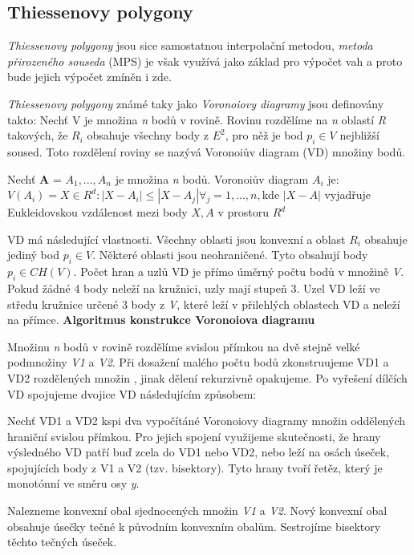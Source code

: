 \documentclass[12pt,a4paper]{article}
\begin{document}
\subsection{Thiessenovy polygony}
\textit{Thiessenovy polygony} jsou sice samostatnou interpolační metodou, \textit{metoda přirozeného souseda} (MPS) je však využívá jako základ pro výpočet vah a proto bude jejich výpočet zmíněn i zde.

\textit{Thiessenovy polygony} známé taky jako \textit{Voronoiovy diagramy} jsou definovány takto: Nechť V je množina \textit{n} bodů v rovině. Rovinu rozdělíme na \textit{n} oblastí \textit{R} takových, že $R_i$ obsahuje všechny body z $E^2$, pro něž je bod $p_i  \in V$ nejbližší soused. Toto rozdělení roviny se nazývá Voronoiův diagram (VD) množiny bodů.

Nechť \textbf{A} = {$A_1,...,A_n$} je množina \textit{n} bodů. Voronoiův diagram $A_i$ je:\newline
$V(A_i)={X \in R^d : |X-A_i| \le |X-A_j| \forall _j = 1,...,n},$\newline kde $|X-A|$ vyjadřuje Eukleidovskou vzdálenost mezi body $X,A$ v prostoru $R^d$

VD má následující vlastnosti. Všechny oblasti jsou konvexní a oblast $R_i$ obsahuje jediný bod $p_i \in V$. Některé oblasti jsou neohraničené. Tyto obsahují body $p_i \in CH(V)$. Počet hran a uzlů VD je přímo úměrný počtu bodů v množině \textit{V}. Pokud žádné 4 body neleží na kružnici, uzly mají stupeň 3. Uzel VD leží ve středu kružnice určené 3 body z \textit{V}, které leží v přilehlých oblastech VD a neleží na přímce.
\bigskip
\textbf{Algoritmus konstrukce Voronoiova diagramu}

Množinu \textit{n} bodů v rovině rozdělíme svislou přímkou na dvě stejně velké podmnožiny \textit{V1} a \textit{V2}. Při dosažení malého počtu bodů zkonstruujeme VD1 a VD2 rozdělených množin , jinak dělení rekurzivně opakujeme. Po vyřešení dílčích VD spojujeme dvojice VD následujícím způsobem:

Nechť VD1 a VD2 kspi dva vypočítáné Voronoiovy diagramy množin oddělených hraniční svislou přímkou. Pro jejich spojení využijeme skutečnosti, že hrany výsledného VD patří buď zcela do VD1 nebo VD2, nebo leží na osách úseček, spojujících body z V1 a V2 (tzv. bisektory). Tyto hrany tvoří řetěz, který je monotónní ve směru osy \textit{y}.

Nalezneme konvexní obal sjednocených množin \textit{V1} a \textit{V2}. Nový konvexní obal obsahuje úsečky tečné k původním konvexním obalům. Sestrojíme bisektory těchto tečných úseček.
\end{document}
